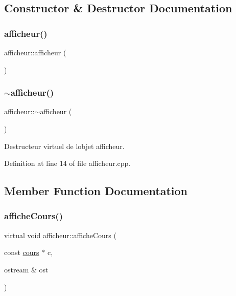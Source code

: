 \subsection{Constructor \& Destructor Documentation}
\hypertarget{classafficheur_a6bc02ed7b0dbbb21607528ae03c4f886}{}\label{classafficheur_a6bc02ed7b0dbbb21607528ae03c4f886} 
\subsubsection{\texorpdfstring{afficheur()}{afficheur()}}
{\footnotesize\ttfamily afficheur\+::afficheur (\begin{DoxyParamCaption}{ }\end{DoxyParamCaption})\hspace{0.3cm}{\ttfamily [default]}}

\hypertarget{classafficheur_a093c44d15f6de24883abce836bfd11c9}{}\label{classafficheur_a093c44d15f6de24883abce836bfd11c9} 
\subsubsection{\texorpdfstring{$\sim$afficheur()}{~afficheur()}}
{\footnotesize\ttfamily afficheur\+::$\sim$afficheur (\begin{DoxyParamCaption}{ }\end{DoxyParamCaption})\hspace{0.3cm}{\ttfamily [virtual]}}



Destructeur virtuel de l\textquotesingle{}objet afficheur. 



Definition at line 14 of file afficheur.\+cpp.



\subsection{Member Function Documentation}
\hypertarget{classafficheur_a9d176576ad45c2a07a8a887b853b7edb}{}\label{classafficheur_a9d176576ad45c2a07a8a887b853b7edb} 
\subsubsection{\texorpdfstring{affiche\+Cours()}{afficheCours()}}
{\footnotesize\ttfamily virtual void afficheur\+::affiche\+Cours (\begin{DoxyParamCaption}\item[{const \hyperlink{classcours}{cours} $\ast$}]{c,  }\item[{ostream \&}]{ost }\end{DoxyParamCaption})\hspace{0.3cm}{\ttfamily [pure virtual]}}




